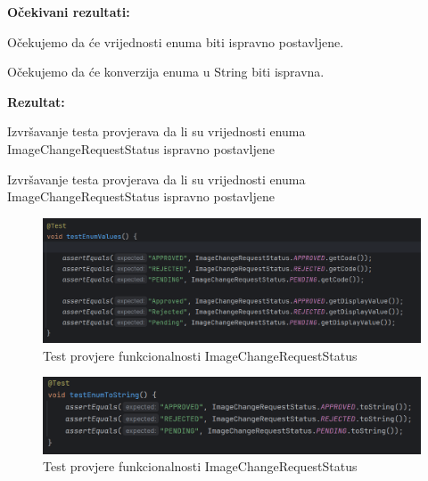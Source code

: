                                     \noindent\textbf{Očekivani rezultati:}
                                    \begin{packed_item}
                                    	\item Očekujemo da će vrijednosti enuma biti ispravno postavljene.
                                    	\item Očekujemo da će konverzija enuma u String biti ispravna.
                                    \end{packed_item}
                                    \noindent\textbf{Rezultat:}
                                    \begin{packed_item}
                                    	\item Izvršavanje testa provjerava da li su vrijednosti enuma ImageChangeRequestStatus ispravno postavljene
                                    	\item Izvršavanje testa provjerava da li su vrijednosti enuma ImageChangeRequestStatus ispravno postavljene
                                    \end{packed_item}
                                    
                                    
                        \begin{figure} [H]
                        	\centering
                        	\includegraphics[width=0.7\linewidth]{slike/ImageChangeTest.png}
                        	\caption{Test provjere funkcionalnosti ImageChangeRequestStatus}
                        	\label{fig:Test provjere funkcionalnosti ImageChangeRequestStatus}
                        \end{figure}
                        
                        \begin{figure} [H]
                        	\centering
                        	\includegraphics[width=0.7\linewidth]{slike/ImageChangeTest1.png}
                        	\caption{Test provjere funkcionalnosti ImageChangeRequestStatus}
                        	\label{fig:Test provjere funkcionalnosti ImageChangeRequestStatus}
                        \end{figure}
                                    
